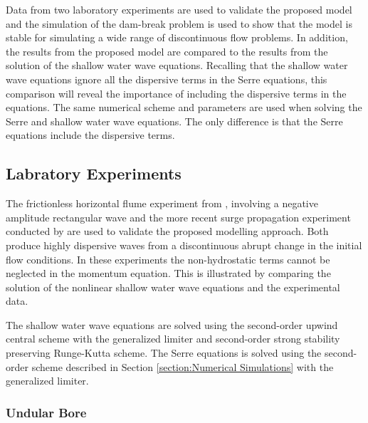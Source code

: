 \documentclass[SingleSpace,12pt]{Serre_ASCE}
\begin{document}
Data from two laboratory experiments are used to validate the proposed model and the simulation of the dam-break problem is used to show that the model is stable for simulating a wide range of discontinuous flow problems. In addition, the results from the proposed model are compared to the results from the solution of the shallow water wave equations. Recalling that the shallow water wave equations ignore all the dispersive terms in the Serre equations, this comparison will reveal the importance of including the dispersive terms in the equations. The same numerical scheme and parameters are used when solving the Serre and shallow water wave equations. The only difference is that the Serre equations include the dispersive terms.

\subsection{Labratory Experiments}\label{Laboratory_Experiments}

The frictionless horizontal flume experiment from , involving a negative amplitude rectangular wave and the more recent surge propagation experiment conducted by  are used to validate the proposed modelling approach. Both produce highly dispersive waves from a discontinuous abrupt change in the initial flow conditions. In these experiments the non-hydrostatic terms cannot be neglected in the momentum equation. This is illustrated by comparing the solution of the nonlinear shallow water wave equations and the experimental data.

The shallow water wave equations are solved using the second-order upwind central scheme with the generalized limiter and second-order strong stability preserving Runge-Kutta scheme. The Serre equations is solved using the second-order scheme described in Section \ref{section:Numerical Simulations} with the generalized limiter.

\subsubsection{Undular Bore}\label{Undular Bore}
\end{document}
